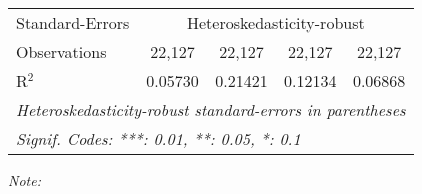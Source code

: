 \begin{table}[htbp!]
\begin{adjustbox}{width = 1\textwidth, max height = 0.95\textheight, center}
\begin{threeparttable}[b]
\begin{tabular}{lcccc}
            \midrule 
            Standard-Errors & \multicolumn{4}{c}{Heteroskedasticity-robust} \\ 
            Observations         & 22,127                         & 22,127                         & 22,127                          & 22,127\\  
            R$^2$                & 0.05730                        & 0.21421                        & 0.12134                         & 0.06868\\  
            \midrule \midrule
            \multicolumn{5}{l}{\emph{Heteroskedasticity-robust standard-errors in parentheses}}\\
            \multicolumn{5}{l}{\emph{Signif. Codes: ***: 0.01, **: 0.05, *: 0.1}}\\
         \end{tabular}
         
         \begin{tablenotes}\item \medskip \textit{Note:}
         \end{tablenotes}
      \end{threeparttable}
   \end{adjustbox}
\end{table}


